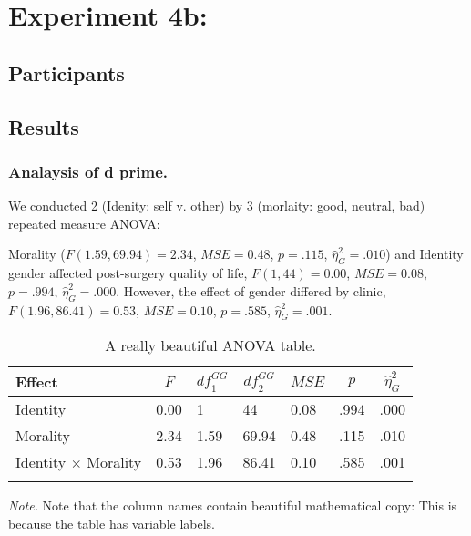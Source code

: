 \documentclass[man]{apa6}
\begin{document}
\hypertarget{experiment-4b}{%
\section{Experiment 4b:}\label{experiment-4b}}

\hypertarget{participants}{%
\subsection{Participants}\label{participants}}

\hypertarget{results}{%
\subsection{Results}\label{results}}

\hypertarget{analaysis-of-d-prime.}{%
\subsubsection{Analaysis of d prime.}\label{analaysis-of-d-prime.}}

We conducted 2 (Idenity: self v. other) by 3 (morlaity: good, neutral, bad) repeated measure ANOVA:

Morality (\(F(1.59, 69.94) = 2.34\), \(\mathit{MSE} = 0.48\), \(p = .115\), \(\hat{\eta}^2_G = .010\)) and Identity gender affected post-surgery quality of life, \(F(1, 44) = 0.00\), \(\mathit{MSE} = 0.08\), \(p = .994\), \(\hat{\eta}^2_G = .000\). However, the effect of gender differed by clinic, \(F(1.96, 86.41) = 0.53\), \(\mathit{MSE} = 0.10\), \(p = .585\), \(\hat{\eta}^2_G = .001\).

\begin{table}[tbp]
\begin{center}
\begin{threeparttable}
\caption{\label{tab:unnamed-chunk-2}A really beautiful ANOVA table.}
\begin{tabular}{lllllll}
\toprule
Effect & \multicolumn{1}{c}{$F$} & \multicolumn{1}{c}{$\mathit{df}_1^{GG}$} & \multicolumn{1}{c}{$\mathit{df}_2^{GG}$} & \multicolumn{1}{c}{$\mathit{MSE}$} & \multicolumn{1}{c}{$p$} & \multicolumn{1}{c}{$\hat{\eta}^2_G$}\\
\midrule
Identity & 0.00 & 1 & 44 & 0.08 & .994 & .000\\
Morality & 2.34 & 1.59 & 69.94 & 0.48 & .115 & .010\\
Identity $\times$ Morality & 0.53 & 1.96 & 86.41 & 0.10 & .585 & .001\\
\bottomrule
\addlinespace
\end{tabular}
\begin{tablenotes}[para]
\normalsize{\textit{Note.} Note that the column names contain beautiful mathematical copy: This is because the table has variable labels.}
\end{tablenotes}
\end{threeparttable}
\end{center}
\end{table}
\end{document}
